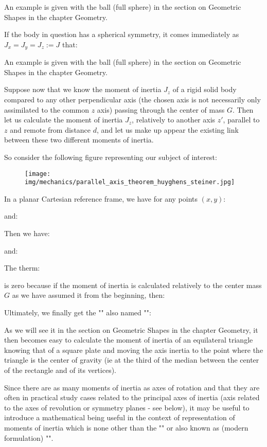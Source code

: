 	An example is given with the ball (full sphere) in the section on Geometric Shapes in the chapter Geometry.
	
	If the body in question has a spherical symmetry, it comes immediately as $J_x=J_y=J_z:=J$ that:
	
	An example is given with the ball (full sphere) in the section on Geometric Shapes in the chapter Geometry.
	
	Suppose now that we know the moment of inertia $J_z$ of a rigid solid body compared to any other perpendicular axis (the chosen axis is not necessarily only assimilated to the common $z$ axis) passing through the center of mass $G$. Then let us calculate the moment of inertia $J_z$, relatively to another axis $z'$, parallel to  $z$ and remote from distance $d$, and let us make up appear the existing link between these two different moments of inertia.
	
	So consider the following figure representing our subject of interest:
	\begin{figure}[H]
		\centering
		\texttt{[image: img/mechanics/parallel\_axis\_theorem\_huyghens\_steiner.jpg]}
	\end{figure}
	 In a planar Cartesian reference frame, we have for any points $(x, y)$:
   
   and:
   
   Then we have:
   
   and:
   
   The therm:
    
   is zero because if the moment of inertia is calculated relatively to the center mass $G$ as we have assumed it from the beginning, then:
   
   Ultimately, we finally get the "" also named "":
   
    As we will see it in the section on Geometric Shapes in the chapter Geometry, it then becomes easy to calculate the moment of inertia of an equilateral triangle knowing that of a square plate and moving the axis inertia to the point where the triangle is the center of gravity (ie at the third of the median between the center of the rectangle and of its vertices).

   Since there are as many moments of inertia as axes of rotation and that they are often in practical study cases related to the principal axes of inertia (axis related to the axes of revolution or symmetry planes - see below), it may be useful to introduce a mathematical being useful in the context of representation of moments of inertia which is none other than the "" or also known as (modern formulation) "".
   
